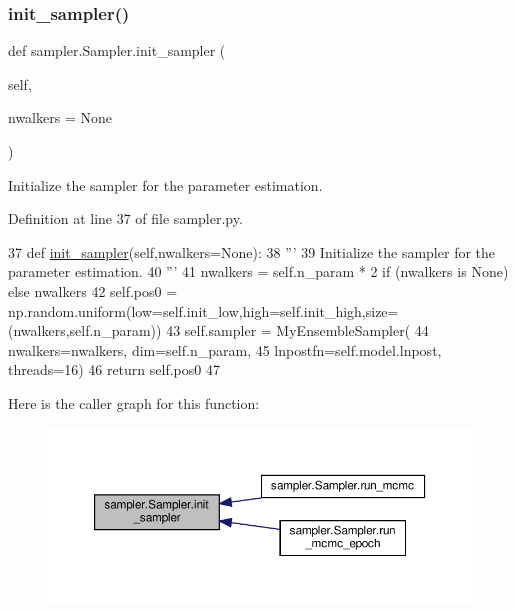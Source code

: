 \mbox{\label{classsampler_1_1Sampler_aebf7df56d9b2f3bb74c0809bd4ce97d1}} 
\subsubsection{\texorpdfstring{init\+\_\+sampler()}{init\_sampler()}}
{\footnotesize\ttfamily def sampler.\+Sampler.\+init\+\_\+sampler (\begin{DoxyParamCaption}\item[{}]{self,  }\item[{}]{nwalkers = {\ttfamily None} }\end{DoxyParamCaption})}

\begin{DoxyVerb}Initialize the sampler for the parameter estimation.
\end{DoxyVerb}
 

Definition at line 37 of file sampler.\+py.


\begin{DoxyCode}
37     \textcolor{keyword}{def }\hyperlink{classsampler_1_1Sampler_aebf7df56d9b2f3bb74c0809bd4ce97d1}{init\_sampler}(self,nwalkers=None):
38         \textcolor{stringliteral}{'''}
39 \textcolor{stringliteral}{        Initialize the sampler for the parameter estimation.}
40 \textcolor{stringliteral}{        '''}
41         nwalkers = self.n\_param * 2 \textcolor{keywordflow}{if} (nwalkers \textcolor{keywordflow}{is} \textcolor{keywordtype}{None}) \textcolor{keywordflow}{else} nwalkers 
42         self.pos0 = np.random.uniform(low=self.init\_low,high=self.init\_high,size=(nwalkers,self.n\_param))
43         self.sampler = MyEnsembleSampler(
44             nwalkers=nwalkers, dim=self.n\_param,
45             lnpostfn=self.model.lnpost, threads=16)
46         \textcolor{keywordflow}{return} self.pos0
47     
\end{DoxyCode}
Here is the caller graph for this function\+:\nopagebreak
\begin{figure}[H]
\begin{center}
\leavevmode
\includegraphics[width=350pt]{d3/d8a/classsampler_1_1Sampler_aebf7df56d9b2f3bb74c0809bd4ce97d1_icgraph}
\end{center}
\end{figure}
\mbox{\label{classsampler_1_1Sampler_ad8e9c065a95873230d9e0310f1b893cc}} 
